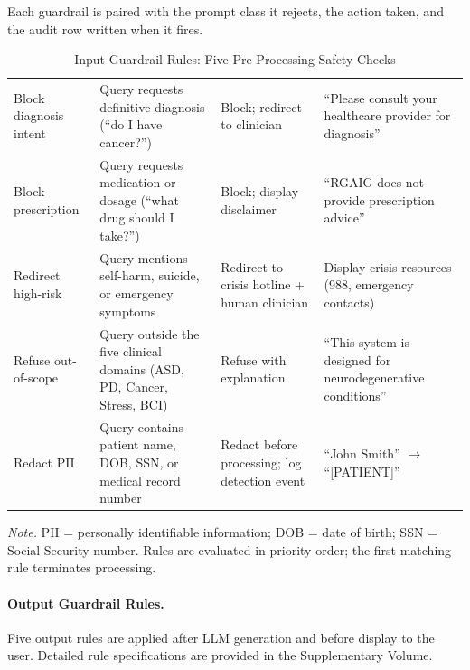 {\tablestripes\tablefontsize

\noindent Each guardrail is paired with the prompt class it rejects, the action taken, and the audit row written when it fires.
\begin{xltabular}{\textwidth}{@{} >{\raggedright\arraybackslash}p{2cm} L L >{\raggedright\arraybackslash}p{3.5cm} @{}}
\caption[Input Guardrail Rules]{Input Guardrail Rules: Five Pre-Processing Safety Checks}\label{tab:app_ch3_input_guardrails} \\
\toprule
{} &  &  &  \\
\midrule
\endfirsthead
\endhead
\bottomrule
\endlastfoot
Block diagnosis intent & Query requests definitive diagnosis (``do I have cancer?'') & Block; redirect to clinician & ``Please consult your healthcare provider for diagnosis'' \\
\addlinespace
Block prescription & Query requests medication or dosage (``what drug should I take?'') & Block; display disclaimer & ``RGAIG does not provide prescription advice'' \\
\addlinespace
Redirect high-risk & Query mentions self-harm, suicide, or emergency symptoms & Redirect to crisis hotline + human clinician & Display crisis resources (988, emergency contacts) \\
\addlinespace
Refuse out-of-scope & Query outside the five clinical domains (ASD, PD, Cancer, Stress, BCI) & Refuse with explanation & ``This system is designed for neurodegenerative conditions'' \\
\addlinespace
Redact PII & Query contains patient name, DOB, SSN, or medical record number & Redact before processing; log detection event & ``John Smith'' $\to$ ``[PATIENT]'' \\
\end{xltabular}}
\vspace{0.5em}\noindent\textit{Note.} PII = personally identifiable information; DOB = date of birth; SSN = Social Security number. Rules are evaluated in priority order; the first matching rule terminates processing.

\paragraph{Output Guardrail Rules.}

Five output rules are applied after LLM generation and before display to the user. Detailed rule specifications are provided in the Supplementary Volume.

